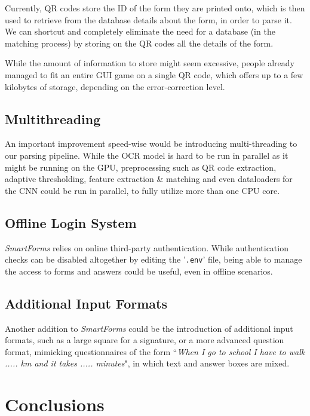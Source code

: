 \documentclass[11pt, a4paper]{report}
\def\code#1{\texttt{#1}}
\begin{document}
Currently, QR codes store the ID of the form they are printed onto, which is then used to retrieve from the database details about the form, in order to parse it. We can shortcut and completely eliminate the need for a database (in the matching process) by storing on the QR codes all the details of the form.

While the amount of information to store might seem excessive, people already managed to fit an entire GUI game on a single QR code\cite{game-qr-code}, which offers up to a few kilobytes of storage, depending on the error-correction level.

\subsection{Multithreading}

An important improvement speed-wise would be introducing multi-threading to our parsing pipeline. While the OCR model is hard to be run in parallel as it might be running on the GPU, preprocessing such as QR code extraction, adaptive thresholding, feature extraction \& matching and even dataloaders for the CNN could be run in parallel, to fully utilize more than one CPU core. 


\subsection{Offline Login System}

\textit{SmartForms} relies on online third-party authentication. While authentication checks can be disabled altogether by editing the '\code{.env}' file, being able to manage the access to forms and answers could be useful, even in offline scenarios.

\subsection{Additional Input Formats}

Another addition to \textit{SmartForms} could be the introduction of additional input formats, such as a large square for a signature, or a more advanced question format, mimicking questionnaires of the form ``\textit{When I go to school I have to walk ..... km and it takes ..... minutes}", in which text and answer boxes are mixed.

\section{Conclusions}
\end{document}
